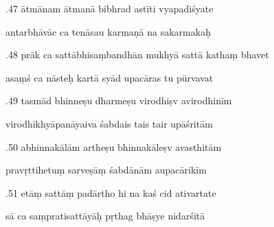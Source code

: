 \documentclass[article,12pt,a4paper]{memoir}%
\newcounter{parCount}
\begin{document}
	  
	  \pstart {}.47 ātmānam ātmanā bibhrad astīti vyapadiśyate 
	{}
	\pend%
      

	  
	  \pstart \leavevmode%
	antarbhāvāc ca tenāsau karmaṇā na sakarmakaḥ 
	{}
	\pend%
      

	  
	  \pstart {}.48 prāk ca sattābhisaṃbandhān mukhyā sattā kathaṃ bhavet 
	{}
	\pend%
      

	  
	  \pstart \leavevmode%
	asaṃś ca nāsteḥ kartā syād upacāras tu pūrvavat 
	{}
	\pend%
      

	  
	  \pstart {}.49 tasmād bhinneṣu dharmeṣu virodhiṣv avirodhinīm 
	{}
	\pend%
      

	  
	  \pstart \leavevmode%
	virodhikhyāpanāyaiva śabdais tais tair upāśritām 
	{}
	\pend%
      

	  
	  \pstart {}.50 abhinnakālām artheṣu bhinnakāleṣv avasthitām 
	{}
	\pend%
      

	  
	  \pstart \leavevmode%
	pravṛttihetuṃ sarveṣāṃ śabdānām aupacārikīm 
	{}
	\pend%
      

	  
	  \pstart {}.51 etāṃ sattāṃ padārtho hi na kaś cid ativartate 
	{}
	\pend%
      

	  
	  \pstart \leavevmode%
	sā ca saṃpratisattāyāḥ pṛthag bhāṣye nidarśitā 
	{}
	\pend%
      
\end{document}

